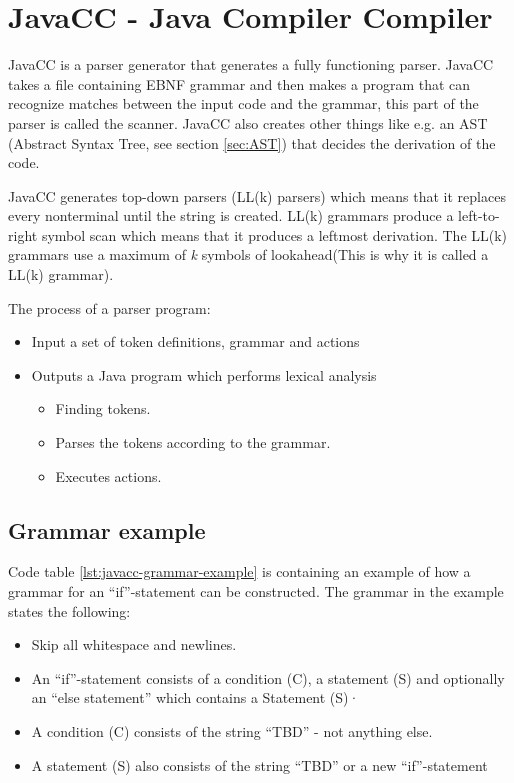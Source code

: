 \chapter{JavaCC - Java Compiler Compiler}
JavaCC is a parser generator that generates a fully functioning parser. JavaCC takes a file containing EBNF grammar and then makes a program that can recognize matches between the input code and the grammar, this part of the parser is called the scanner. JavaCC also creates other things like e.g. an AST (Abstract Syntax Tree, see section \ref{sec:AST}) that decides the derivation of the code. \cite{JavaCC}

JavaCC generates top-down parsers (LL(k) parsers) which means that it replaces every nonterminal until the string is created. LL(k) grammars produce a left-to-right symbol scan which means that it produces a leftmost derivation. The LL(k) grammars use a maximum of \textit{k} symbols of lookahead(This is why it is called a LL(k) grammar).\cite{javacc-wustl-ppt}

The process of a parser program:
\begin{itemize}
\item Input a set of token definitions, grammar and actions
\item Outputs a Java program which performs lexical analysis
	\begin{itemize}
	\item Finding tokens.
	\item Parses the tokens according to the grammar.
	\item Executes actions.
	\end{itemize}
\end{itemize}


\section{Grammar example}
Code table \ref{lst:javacc-grammar-example} is containing an example of how a grammar for an ``if''-statement can be constructed. The grammar in the example states the following:

\begin{itemize}
	\item Skip all whitespace and newlines.
	\item An ``if''-statement consists of a condition (C), a statement (S)  and optionally an ``else statement'' which contains a Statement (S)·
	\item A condition (C) consists of the string ``TBD'' - not anything else.
	\item A statement (S) also consists of the string ``TBD'' or a new ``if''-statement
\end{itemize}


